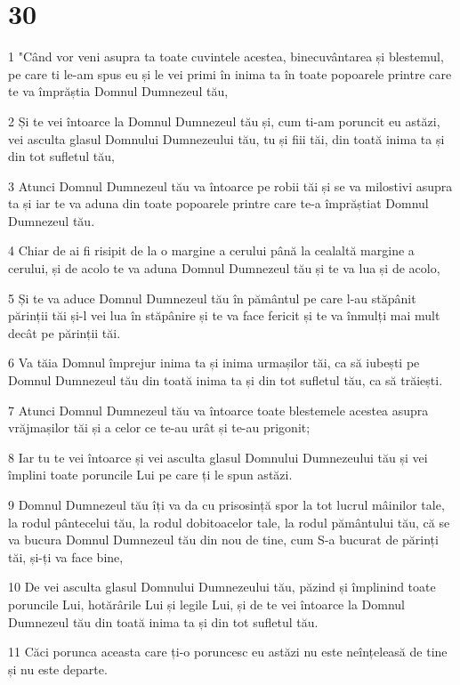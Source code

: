 \chapter{30}

\par 1 "Când vor veni asupra ta toate cuvintele acestea, binecuvântarea și blestemul, pe care ti le-am spus eu și le vei primi în inima ta în toate popoarele printre care te va împrăștia Domnul Dumnezeul tău,
\par 2 Și te vei întoarce la Domnul Dumnezeul tău și, cum ti-am poruncit eu astăzi, vei asculta glasul Domnului Dumnezeului tău, tu și fiii tăi, din toată inima ta și din tot sufletul tău,
\par 3 Atunci Domnul Dumnezeul tău va întoarce pe robii tăi și se va milostivi asupra ta și iar te va aduna din toate popoarele printre care te-a împrăștiat Domnul Dumnezeul tău.
\par 4 Chiar de ai fi risipit de la o margine a cerului până la cealaltă margine a cerului, și de acolo te va aduna Domnul Dumnezeul tău și te va lua și de acolo,
\par 5 Și te va aduce Domnul Dumnezeul tău în pământul pe care l-au stăpânit părinții tăi și-l vei lua în stăpânire și te va face fericit și te va înmulți mai mult decât pe părinții tăi.
\par 6 Va tăia Domnul împrejur inima ta și inima urmașilor tăi, ca să iubești pe Domnul Dumnezeul tău din toată inima ta și din tot sufletul tău, ca să trăiești.
\par 7 Atunci Domnul Dumnezeul tău va întoarce toate blestemele acestea asupra vrăjmașilor tăi și a celor ce te-au urât și te-au prigonit;
\par 8 Iar tu te vei întoarce și vei asculta glasul Domnului Dumnezeului tău și vei împlini toate poruncile Lui pe care ți le spun astăzi.
\par 9 Domnul Dumnezeul tău îți va da cu prisosință spor la tot lucrul mâinilor tale, la rodul pântecelui tău, la rodul dobitoacelor tale, la rodul pământului tău, că se va bucura Domnul Dumnezeul tău din nou de tine, cum S-a bucurat de părinți tăi, și-ți va face bine,
\par 10 De vei asculta glasul Domnului Dumnezeului tău, păzind și împlinind toate poruncile Lui, hotărârile Lui și legile Lui, și de te vei întoarce la Domnul Dumnezeul tău din toată inima ta și din tot sufletul tău.
\par 11 Căci porunca aceasta care ți-o poruncesc eu astăzi nu este neînțeleasă de tine și nu este departe.
